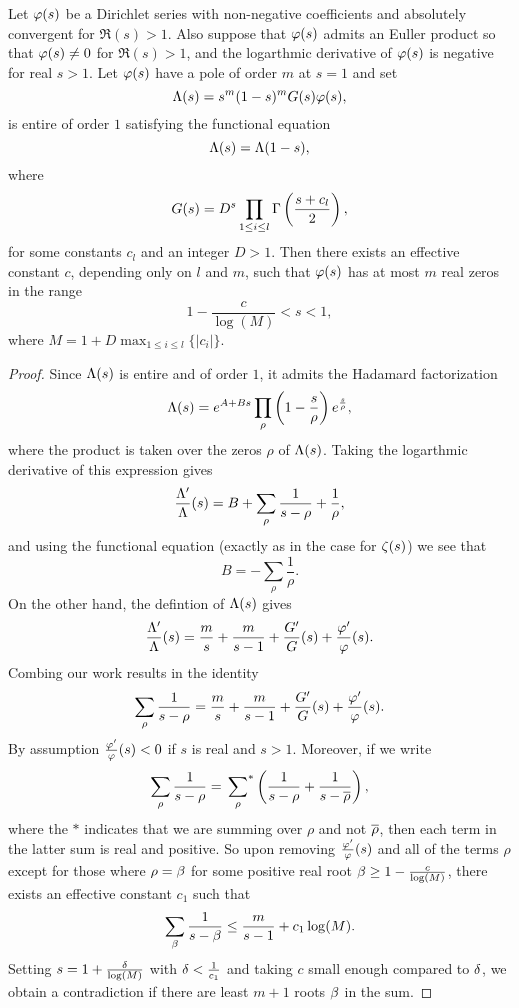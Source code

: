 \documentclass[12pt,reqno,oneside]{amsart}
\begin{document}
    \begin{lemma}\label{lem:product_lemma}
        Let $\varphi(s)$ be a Dirichlet series with non-negative coefficients and absolutely convergent for $\Re(s) > 1$. Also suppose that $\varphi(s)$ admits an Euller product so that $\varphi(s) \neq 0$ for $\Re(s) > 1$, and the logarthmic derivative of $\varphi(s)$ is negative for real $s > 1$. Let $\varphi(s)$ have a pole of order $m$ at $s = 1$ and set
        \[
            \Lambda(s) = s^{m}(1-s)^{m}G(s)\varphi(s),
        \]
        is entire of order $1$ satisfying the functional equation
        \[
            \Lambda(s) = \Lambda(1-s),
        \]
        where
        \[
            G(s) = D^{s}\prod_{1 \le i \le l}\Gamma\left(\frac{s+c_{l}}{2}\right),
        \]
        for some constants $c_{l}$ and an integer $D > 1$. Then there exists an effective constant $c$, depending only on $l$ and $m$, such that $\varphi(s)$ has at most $m$ real zeros in the range
        \[
            1-\frac{c}{\log(M)} < s < 1,
        \]
        where $M = 1+D\max_{1 \le i \le l}\{|c_{i}|\}$.
    \end{lemma}
    \begin{proof}
        Since $\Lambda(s)$ is entire and of order $1$, it admits the Hadamard factorization
        \[
            \Lambda(s) = e^{A+Bs}\prod_{\rho}\left(1-\frac{s}{\rho}\right)e^{\frac{s}{\rho}},
        \]
        where the product is taken over the zeros $\rho$ of $\Lambda(s)$. Taking the logarthmic derivative of this expression gives
        \[
            \frac{\Lambda'}{\Lambda}(s) = B+\sum_{\rho}\frac{1}{s-\rho}+\frac{1}{\rho},
        \]
        and using the functional equation (exactly as in the case for $\zeta(s)$) we see that
        \[
            B = -\sum_{\rho}\frac{1}{\rho}.
        \]
        On the other hand, the defintion of $\Lambda(s)$ gives
        \[
            \frac{\Lambda'}{\Lambda}(s) = \frac{m}{s}+\frac{m}{s-1}+\frac{G'}{G}(s)+\frac{\varphi'}{\varphi}(s).
        \]
        Combing our work results in the identity
        \[
            \sum_{\rho}\frac{1}{s-\rho} = \frac{m}{s}+\frac{m}{s-1}+\frac{G'}{G}(s)+\frac{\varphi'}{\varphi}(s).
        \]
        By assumption $\frac{\varphi'}{\varphi}(s) < 0$ if $s$ is real and $s > 1$. Moreover, if we write
        \[
            \sum_{\rho}\frac{1}{s-\rho} = \sideset{}{^{\ast}}\sum_{\rho}\left(\frac{1}{s-\rho}+\frac{1}{s-\overline{\rho}}\right),
        \]
        where the $\ast$ indicates that we are summing over $\rho$ and not $\overline{\rho}$, then each term in the latter sum is real and positive. So upon removing $\frac{\varphi'}{\varphi}(s)$ and all of the terms $\rho$ except for those where $\rho = \beta$ for some positive real root $\beta \ge 1-\frac{c}{\log(M)}$, there exists an effective constant $c_{1}$ such that
        \[
            \sum_{\beta}\frac{1}{s-\beta} \le \frac{m}{s-1}+c_{1}\log(M).
        \]
        Setting $s = 1+\frac{\delta}{\log(M)}$ with $\delta < \frac{1}{c_{1}}$ and taking $c$ small enough compared to $\delta$, we obtain a contradiction if there are least $m+1$ roots $\beta$ in the sum.
    \end{proof}
\end{document}
